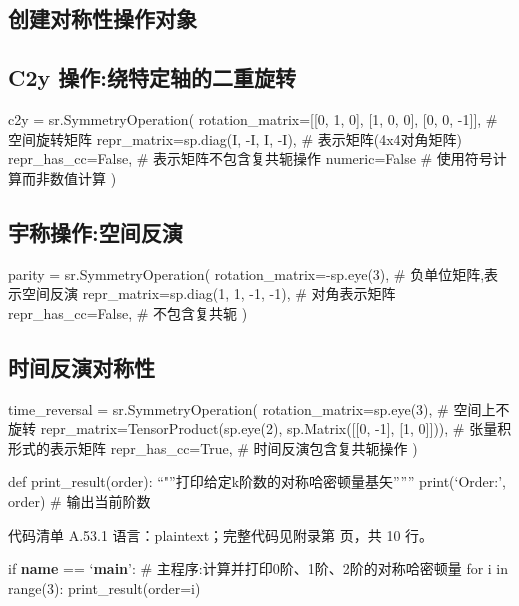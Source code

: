 \documentclass[lang=cn,scheme=chinese,color=blue,device=normal,toc=onecol,math=cm]{elegantbook}
\begin{document}
\subsection{创建对称性操作对象}


\subsection{C2y 操作:绕特定轴的二重旋转}


c2y = sr.SymmetryOperation( rotation\_\allowbreak{}matrix=[[0, 1, 0], [1, 0, 0], [0, 0, -1]], \# 空间旋转矩阵 repr\_\allowbreak{}matrix=sp.diag(I, -I, I, -I), \# 表示矩阵(4x4对角矩阵) repr\_\allowbreak{}has\_\allowbreak{}cc=False, \# 表示矩阵不包含复共轭操作 numeric=False \# 使用符号计算而非数值计算 )\par


\subsection{宇称操作:空间反演}


parity = sr.SymmetryOperation( rotation\_\allowbreak{}matrix=-sp.eye(3), \# 负单位矩阵,表示空间反演 repr\_\allowbreak{}matrix=sp.diag(1, 1, -1, -1), \# 对角表示矩阵 repr\_\allowbreak{}has\_\allowbreak{}cc=False, \# 不包含复共轭 )\par


\subsection{时间反演对称性}


time\_\allowbreak{}reversal = sr.SymmetryOperation( rotation\_\allowbreak{}matrix=sp.eye(3), \# 空间上不旋转 repr\_\allowbreak{}matrix=TensorProduct(sp.eye(2), sp.Matrix([[0, -1], [1, 0]])), \# 张量积形式的表示矩阵 repr\_\allowbreak{}has\_\allowbreak{}cc=True, \# 时间反演包含复共轭操作 )\par


def print\_\allowbreak{}result(order): “"”打印给定k阶数的对称哈密顿量基矢””” print(‘Order:’, order) \# 输出当前阶数\par


\begin{codeindexbox}{代码清单 A.53.1}
语言：plaintext；完整代码见附录第 \pageref{code:53:1} 页，共 10 行。
\end{codeindexbox}


if \textbf{name} == ‘\textbf{main}’: \# 主程序:计算并打印0阶、1阶、2阶的对称哈密顿量 for i in range(3): print\_\allowbreak{}result(order=i)\par
\end{document}
